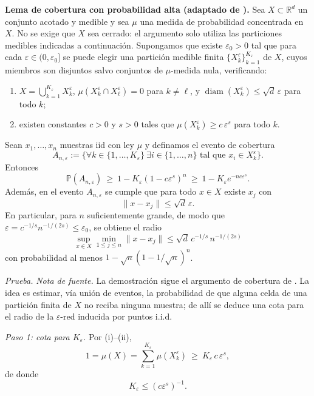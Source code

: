 \medskip
\noindent\textbf{Lema de cobertura con probabilidad alta (adaptado de \cite[Lemma~B.2]{shin2020convergence}).}
Sea $X\subset\mathbb{R}^d$ un conjunto acotado y medible y sea $\mu$ una medida de probabilidad concentrada en $X$.
No se exige que $X$ sea cerrado: el argumento solo utiliza las particiones medibles indicadas a continuación.
Supongamos que existe $\varepsilon_0>0$ tal que para
cada $\varepsilon\in(0,\varepsilon_0]$ se puede elegir una partición medible finita
$\{X_k^\varepsilon\}_{k=1}^{K_\varepsilon}$ de $X$, cuyos miembros son disjuntos
salvo conjuntos de $\mu$-medida nula, verificando:
\begin{enumerate}
\item[(i)] $X=\bigcup_{k=1}^{K_\varepsilon}X_k^\varepsilon$,
$\mu(X_k^\varepsilon\cap X_\ell^\varepsilon)=0$ para $k\neq\ell$, y
$\operatorname{diam}(X_k^\varepsilon)\le \sqrt d\,\varepsilon$ para todo $k$;
\item[(ii)] existen constantes $c>0$ y $s>0$ tales que $\mu(X_k^\varepsilon)\ge c\,\varepsilon^s$ para todo $k$.
\end{enumerate}
Sean $x_1,\dots,x_n$ muestras iid con ley $\mu$ y definamos el evento de cobertura
\[
A_{n,\varepsilon}:=\Big\{\forall k\in\{1,\dots,K_\varepsilon\}\ \exists i\in\{1,\dots,n\}\text{ tal que }x_i\in X_k^\varepsilon\Big\}.
\]
Entonces
\begin{equation}\label{eq:cover_prob_general}
\mathbb{P}(A_{n,\varepsilon})\ \ge\ 1-K_\varepsilon(1-c\varepsilon^s)^n\ \ge\ 1-K_\varepsilon e^{-n c\varepsilon^s}.
\end{equation}
Además, en el evento $A_{n,\varepsilon}$ se cumple que para todo $x\in X$ existe $x_j$ con
\[
\|x-x_j\|\le \sqrt d\,\varepsilon.
\]
En particular, para $n$ suficientemente grande, de modo que
$\varepsilon=c^{-1/s}n^{-1/(2s)}\leq\varepsilon_0$, se obtiene el radio
\[
\sup_{x\in X}\min_{1\le j\le n}\|x-x_j\|\le \sqrt d\,c^{-1/s}\,n^{-1/(2s)}
\]
con probabilidad al menos $1-\sqrt{n}(1-1/\sqrt n)^n$.

\noindent\emph{Prueba.}
\emph{Nota de fuente.}
La demostración sigue el argumento de cobertura de \cite[Lemma~B.2]{shin2020convergence}. La idea es estimar, vía unión de eventos,
la probabilidad de que alguna celda de una partición finita de $X$ no reciba ninguna muestra; de allí se deduce una cota para el radio de la
$\varepsilon$-red inducida por puntos i.i.d.

\smallskip
\textit{Paso 1: cota para $K_\varepsilon$.}
Por (i)--(ii),
\[
1=\mu(X)=\sum_{k=1}^{K_\varepsilon}\mu(X_k^\varepsilon)\ \ge\ K_\varepsilon\,c\,\varepsilon^s,
\]
de donde
\begin{equation}\label{eq:Kb2_bound}
K_\varepsilon\le (c\varepsilon^s)^{-1}.
\end{equation}


